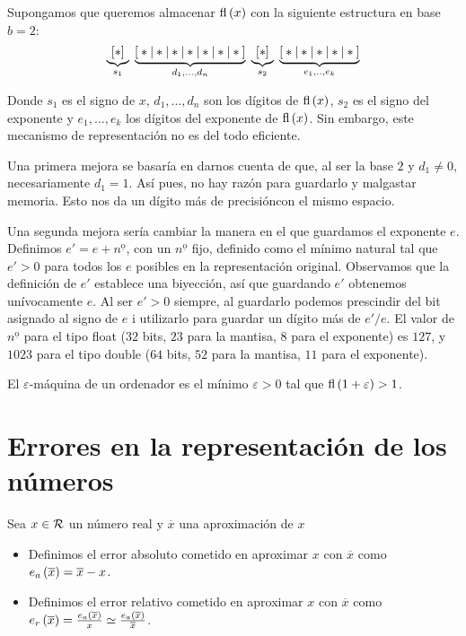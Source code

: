 \begin{obs}
  Supongamos que queremos almacenar $\text{fl}\left( x\right) $ con la siguiente estructura en base $b = 2$:
  \[
	  \underbrace{[*]}_{s_1}
	  \hspace{0.1cm}
	  \underbrace{[{}*|*|*|*|*|*|*{}]}_{d_1,...,d_n}
	  \hspace{0.1cm}
	  \underbrace{[*]}_{s_2}
	  \hspace{0.1cm}
	  \underbrace{[{}*|*|*|*|*{}]}_{e_1,..,e_k}
	  \nonumber
  \]

  Donde $s_1$ es el signo de $x$, $d_1,...,d_n$ son los dígitos de $\text{fl}\left( x\right) $, $s_2$ es el signo del exponente y $e_1,...,e_k$ los dígitos del exponente de $\text{fl}\left( x\right) $. Sin embargo, este mecanismo de representación no es del todo eficiente.

  Una primera mejora se basaría en darnos cuenta de que, al ser la base $2$ y $d_1 \neq 0$, necesariamente $d_1 = 1$. Así pues, no hay razón para guardarlo y malgastar memoria. Esto nos da un dígito más de precisióncon el mismo espacio.

  Una segunda mejora sería cambiar la manera en el que guardamos el exponente $e$. Definimos $e' = e + n^{\underline{\text{o}}}$, con un $n^{\underline{\text{o}}}$ fijo, definido como el mínimo natural tal que $e' > 0$ para todos los $e$ posibles en la representación original. Observamos que la definición de $e'$ establece una biyección, así que guardando $e'$ obtenemos unívocamente $e$. Al ser $e' > 0$ siempre, al guardarlo podemos prescindir del bit asignado al signo de $e$ i utilizarlo para guardar un dígito más de $e'/e$. El valor de $n^{\underline{\text{o}}}$ para el tipo float ($32$ bits, $23$ para la mantisa, $8$ para el exponente) es $127$, y $1023$ para el tipo double ($64$ bits, $52$ para la mantisa, $11$ para el exponente).
\end{obs}

\begin{defi}
	El $\varepsilon$-máquina de un ordenador es el mínimo $\varepsilon > 0$ tal que $\text{fl}\left( 1 + \varepsilon\right)  > 1$.
\end{defi}
        
\section{Errores en la representación de los números}

\begin{defi}
    Sea $x \in \mathcal{R}$ un número real y $\overline{x}$ una aproximación de $x$
    \begin{itemize}
	\item Definimos el error absoluto cometido en aproximar $x$ con $\overline{x}$ como $e_a\left( \overline{x}\right)  = \overline{x} - x$.
	\item Definimos el error relativo cometido en aproximar $x$ con $\overline{x}$ como
	$e_r\left( \overline{x}\right)  = \frac{e_a\left( \overline{x}\right) }{x} \simeq \frac{e_a\left( \overline{x}\right) }{\overline{x}}$.
    \end{itemize}
\end{defi}

